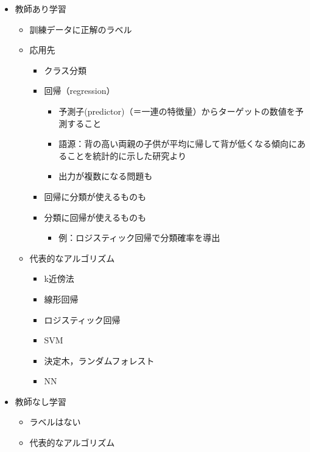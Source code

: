 \begin{itemize}
\tightlist
\item
  教師あり学習

  \begin{itemize}
  \tightlist
  \item
    訓練データに正解のラベル
  \item
    応用先

    \begin{itemize}
    \tightlist
    \item
      クラス分類
    \item
      回帰（regression）

      \begin{itemize}
      \tightlist
      \item
        予測子(predictor)（＝一連の特徴量）からターゲットの数値を予測すること
      \item
        語源：背の高い両親の子供が平均に帰して背が低くなる傾向にあることを統計的に示した研究より
      \item
        出力が複数になる問題も
      \end{itemize}
    \item
      回帰に分類が使えるものも
    \item
      分類に回帰が使えるものも

      \begin{itemize}
      \tightlist
      \item
        例：ロジスティック回帰で分類確率を導出
      \end{itemize}
    \end{itemize}
  \item
    代表的なアルゴリズム

    \begin{itemize}
    \tightlist
    \item
      k近傍法
    \item
      線形回帰
    \item
      ロジスティック回帰
    \item
      SVM
    \item
      決定木，ランダムフォレスト
    \item
      NN
    \end{itemize}
  \end{itemize}
\item
  教師なし学習

  \begin{itemize}
  \tightlist
  \item
    ラベルはない
  \item
    代表的なアルゴリズム


\end{itemize}
\end{itemize}
